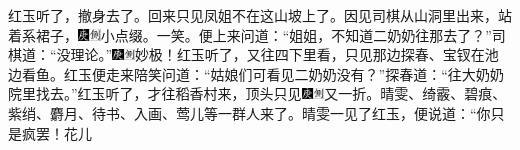 红玉听了，撤身去了。回来只见凤姐不在这山坡上了。因见司棋从山洞里出来，站着系裙子，{\includegraphics[width=3mm]{../Images/00004}\includegraphics[width=3mm]{../Images/00011}\footnotesize \kaishu 小点缀。一笑。}便上来问道：``姐姐，不知道二奶奶往那去了？''司棋道：``没理论。''{\includegraphics[width=3mm]{../Images/00004}\includegraphics[width=3mm]{../Images/00011}\footnotesize \kaishu 妙极！}红玉听了，又往四下里看，只见那边探春、宝钗在池边看鱼。红玉便走来陪笑问道：``姑娘们可看见二奶奶没有？''探春道：``往大奶奶院里找去。''红玉听了，才往稻香村来，顶头只见{\includegraphics[width=3mm]{../Images/00004}\includegraphics[width=3mm]{../Images/00011}\footnotesize \kaishu 又一折。}晴雯、绮霰、碧痕、紫绡、麝月、待书、入画、莺儿等一群人来了。晴雯一见了红玉，便说道：``你只是疯罢！花儿